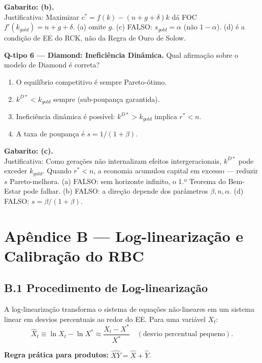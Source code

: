 \documentclass[12pt, a4paper]{article}
\begin{document}
\textbf{Gabarito: (b).}\\
Justificativa: Maximizar $c^* = f(k)-(n+g+\delta)k$ dá FOC $f'(k_{gold}) = n+g+\delta$. (a) omite $g$. (c) FALSO: $s_{gold} = \alpha$ (não $1-\alpha$). (d) é a condição de EE do RCK, não da Regra de Ouro de Solow.

\medskip
\textbf{Q-tipo 6 --- Diamond: Ineficiência Dinâmica.} Qual afirmação sobre o modelo de Diamond é correta?

\begin{enumerate}[label=(\alph*)]
\item O equilíbrio competitivo é sempre Pareto-ótimo.
\item $k^{D*} < k_{gold}$ sempre (sub-poupança garantida).
\item Ineficiência dinâmica é possível: $k^{D*} > k_{gold}$ implica $r^* < n$.
\item A taxa de poupança é $s = 1/(1+\beta)$.
\end{enumerate}

\textbf{Gabarito: (c).}\\
Justificativa: Como gerações não internalizam efeitos intergeracionais, $k^{D*}$ pode exceder $k_{gold}$. Quando $r^* < n$, a economia acumulou capital em excesso --- reduzir $s$ Pareto-melhora. (a) FALSO: sem horizonte infinito, o 1.º Teorema do Bem-Estar pode falhar. (b) FALSO: a direção depende dos parâmetros $\beta, n, \alpha$. (d) FALSO: $s = \beta/(1+\beta)$.

\section*{Apêndice B --- Log-linearização e Calibração do RBC}

\subsection*{B.1 Procedimento de Log-linearização}

A log-linearização transforma o sistema de equações não-lineares em um sistema linear em desvios percentuais ao redor do EE. Para uma variável $X_t$:
\[
\hat{X}_t \equiv \ln X_t - \ln X^* \approx \frac{X_t - X^*}{X^*} \quad (\text{desvio percentual pequeno}).
\]

\textbf{Regra prática para produtos:} $\widehat{XY} = \hat{X} + \hat{Y}$.
\end{document}
